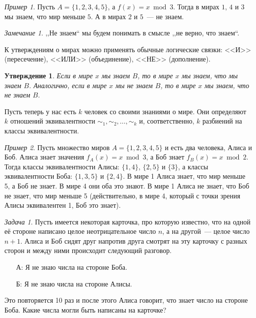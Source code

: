 \documentclass[12pt]{article}
\theoremstyle{definition}
\theoremstyle{plain}
\newtheorem{statement}{Утверждение}[section]
\theoremstyle{remark}
\newtheorem{example}{Пример}[section]
\newtheorem{remark}{Замечание}[section]
\newtheorem{problem}{Задача}[section]
\begin{document}
\begin{example}
    Пусть $A = \{1,2,3,4,5\}$, а $f(x) = x \bmod 3$. Тогда в мирах $1$, $4$ и $3$ мы знаем, 
    что мир меньше $5$.  А в мирах $2$ и $5$~--- не знаем.
\end{example}
\begin{remark}
    ,,Не знаем`` мы будем понимать в смысле ,,не верно, что знаем``.
\end{remark}

К утверждениям о мирах можно применять обычные логические связки: <<И>> (пересечение), <<ИЛИ>> (объединение),
<<НЕ>> (дополнение).

\begin{statement}
    Если в мире $x$ мы знаем $B$, то в мире $x$ мы знаем, что мы знаем $B$.
    Аналогично, если в мире $x$ мы не знаем $B$, то в мире $x$ мы знаем, что не знаем $B$.
\end{statement}

Пусть теперь у нас есть $k$ человек со своими знаниями о мире. 
Они определяют $k$ отношений эквивалентности $\sim_1,\sim_2,\dotsc,\sim_k$ и,
соответственно, $k$ разбиений на классы эквивалентности.

\begin{example}
    Пусть множество миров $A = \{1,2,3,4,5\}$ и есть два человека, Алиса и Боб.
    Алиса знает значения $f_A(x) = x \bmod 3$, а Боб знает $f_B(x) = x\bmod 2$.
    Тогда классы эквивалентности Алисы: $\{1,4\}$, $\{2,5\}$ и $\{3\}$,
    а классы эквивалентности Боба:  $\{1,3,5\}$ и $\{2,4\}$.
    В мире 1 Алиса знает, что мир меньше 5, а Боб не знает. В мире 4 они оба это знают.
    В мире 1 Алиса не знает, что Боб не знает, что мир меньше 5 (действительно, в мире 4,
    который с точки зрения Алисы эквивалентен 1, Боб это знает).
\end{example}

\begin{problem}
    Пусть имеется некоторая карточка, про которую известно, 
    что на одной её стороне написано целое неотрицательное
    число $n$, а на другой~--- целое число $n+1$.
    Алиса и Боб сидят друг напротив друга смотрят на эту карточку с разных сторон и между ними происходит
    следующий разговор.
    \begin{itemize}
        \item[А:] Я не знаю числа на стороне Боба.
        \item[Б:] Я не знаю числа на стороне Алисы.
    \end{itemize}
    Это повторяется 10 раз и после этого Алиса говорит, что знает число на стороне Боба. Какие числа могли быть написаны
    на карточке?
\end{problem}
\end{document}
